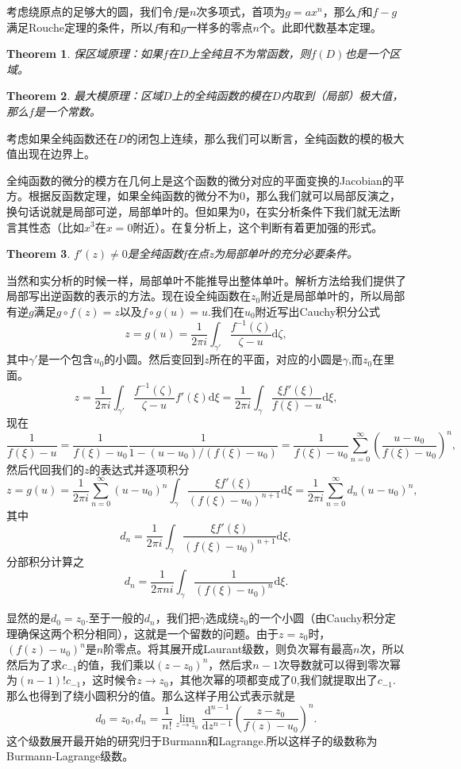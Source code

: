 \documentclass[10pt]{book}
\theoremstyle{plain}%
\newtheorem{theo}{Theorem}[chapter]%
\begin{document}
考虑绕原点的足够大的圆，我们令$f$是$n$次多项式，首项为$g=ax^n$，那么$f$和$f-g$满足Rouche定理的条件，所以$f$有和$g$一样多的零点$n$个。此即代数基本定理。
\begin{theo}
保区域原理：如果$f$在$D$上全纯且不为常函数，则$f(D)$也是一个区域。
\end{theo}
\begin{theo}
最大模原理：区域$D$上的全纯函数的模在$D$内取到（局部）极大值，那么$f$是一个常数。
\end{theo}
考虑如果全纯函数还在$D$的闭包上连续，那么我们可以断言，全纯函数的模的极大值出现在边界上。

全纯函数的微分的模方在几何上是这个函数的微分对应的平面变换的Jacobian的平方。根据反函数定理，如果全纯函数的微分不为0，那么我们就可以局部反演之，换句话说就是局部可逆，局部单叶的。但如果为0，在实分析条件下我们就无法断言其性态（比如$x^3$在$x=0$附近）。在复分析上，这个判断有着更加强的形式。
\begin{theo}
$f'(z)\neq 0$是全纯函数f在点z为局部单叶的充分必要条件。
\end{theo}
当然和实分析的时候一样，局部单叶不能推导出整体单叶。解析方法给我们提供了局部写出逆函数的表示的方法。现在设全纯函数在$z_0$附近是局部单叶的，所以局部有逆$g$满足$g\circ f (z) =z$以及$f\circ g (u) =u$.我们在$u_0$附近写出Cauchy积分公式
\[
z=g(u)=\frac{1}{2\pi i}\int_{\gamma'} \frac{f^{-1}(\zeta)}{\zeta-u}\mathrm{d}\zeta,
\]
其中$\gamma'$是一个包含$u_0$的小圆。然后变回到$z$所在的平面，对应的小圆是$\gamma$,而$z_0$在里面。
\[z=\frac{1}{2\pi i}\int_{\gamma'} \frac{f^{-1}(\zeta)}{\zeta-u}f'(\xi)\mathrm{d}\xi=\frac{1}{2\pi i}\int_\gamma \frac{\xi f'(\xi)}{f(\xi)-u}\mathrm{d}\xi,\]
现在
\[\frac{1}{f(\xi)-u}=\frac{1}{f(\xi)-u_0}\frac{1}{1-(u-u_0)/(f(\xi)-u_0)}=\frac{1}{f(\xi)-u_0}\sum_{n=0}^\infty \left(\frac{u-u_0}{f(\xi)-u_0}\right)^n,\]
然后代回我们的$z$的表达式并逐项积分
\[z=g(u)=\frac{1}{2\pi i}\sum_{n=0}^\infty (u-u_0)^n\int_\gamma \frac{\xi f'(\xi)}{\left(f(\xi)-u_0\right)^{n+1}}\mathrm{d}\xi=\frac{1}{2\pi i}\sum_{n=0}^\infty d_n(u-u_0)^n,\]
其中\[d_n=\frac{1}{2\pi i}\int_\gamma \frac{\xi f'(\xi)}{\left(f(\xi)-u_0\right)^{n+1}}\mathrm{d}\xi,\]分部积分计算之\[d_n=\frac{1}{2\pi ni}\int_\gamma \frac{1}{\left(f(\xi)-u_0\right)^n}\mathrm{d}\xi.\]

显然的是$d_0=z_0$.至于一般的$d_n$，我们把$\gamma$选成绕$z_0$的一个小圆（由Cauchy积分定理确保这两个积分相同），这就是一个留数的问题。由于$z=z_0$时，
$\left(f(z)-u_0\right)^n$是$n$阶零点。将其展开成Laurant级数，则负次幂有最高$n$次，所以然后为了求$c_{-1}$的值，我们乘以$(z-z_0)^n$，然后求$n-1$次导数就可以得到零次幂为$(n-1)!c_{-1}$，这时候令$z\to z_0$，其他次幂的项都变成了0,我们就提取出了$c_{-1}$.那么也得到了绕小圆积分的值。那么这样子用公式表示就是
\[
d_0=z_0,d_n=\frac{1}{n!}\lim_{z\to z_0}\frac{\mathrm{d}^{n-1}}{\mathrm{d}z^{n-1}}\left(\frac{z-z_0}{f(z)-u_0}\right)^n.
\]
这个级数展开最开始的研究归于Burmann和Lagrange.所以这样子的级数称为Burmann-Lagrange级数。
\end{document}
